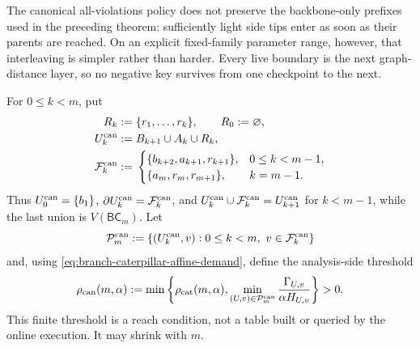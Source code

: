 The canonical all-violations policy does not preserve the backbone-only
prefixes used in the preceding theorem: sufficiently light side tips enter
as soon as their parents are reached.  On an explicit fixed-family parameter
range, however, that interleaving is simpler rather than harder.  Every live
boundary is the next graph-distance layer, so no negative key survives from
one checkpoint to the next.

For $0\leq k<m$, put
\begin{equation}
 \begin{split}
 R_k&:=\{r_1,\ldots,r_k\},\qquad R_0:=\varnothing,\\
 U_k^{\rm can}&:=B_{k+1}\cup A_k\cup R_k,\\
 \mathcal F_k^{\rm can}
 &:={}
 \begin{cases}
  \{b_{k+2},a_{k+1},r_{k+1}\},&0\leq k<m-1,\\
  \{a_m,r_m,r_{m+1}\},&k=m-1.
 \end{cases}
 \end{split}
 \label{eq:branch-caterpillar-canonical-layers}
\end{equation}
Thus $U_0^{\rm can}=\{b_1\}$,
$\partial U_k^{\rm can}=\mathcal F_k^{\rm can}$, and
$U_k^{\rm can}\cup\mathcal F_k^{\rm can}=U_{k+1}^{\rm can}$ for
$k<m-1$, while the last union is $V(\mathsf{BC}_m)$.  Let
\begin{equation}
 \mathcal P_m^{\rm can}:=
 \{(U_k^{\rm can},v):0\leq k<m,\ v\in\mathcal F_k^{\rm can}\}
 \label{eq:branch-caterpillar-canonical-pairs}
\end{equation}
and, using \eqref{eq:branch-caterpillar-affine-demand}, define the
analysis-side threshold
\begin{equation}
 \rho_{\rm can}(m,\alpha)
 :=\min\left\{
  \rho_{\rm cat}(m,\alpha),
  \min_{(U,v)\in\mathcal P_m^{\rm can}}
  \frac{\Gamma_{U,v}}{\alpha H_{U,v}}
 \right\}>0.
 \label{eq:branch-caterpillar-canonical-threshold}
\end{equation}
This finite threshold is a reach condition, not a table built or queried by
the online execution.  It may shrink with $m$.

